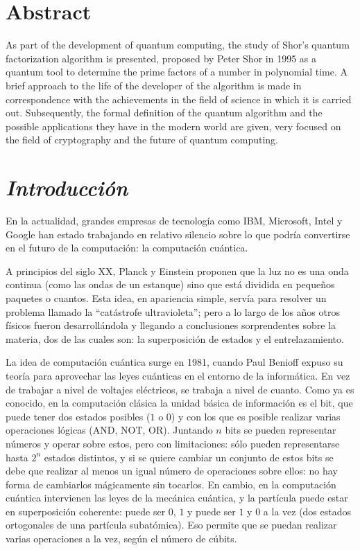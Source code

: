 \documentclass[a4paper,11pt]{article}
\begin{document}
\section*{Abstract}
As part of the development of quantum computing, the study of Shor's quantum factorization algorithm is presented, proposed by Peter Shor in 1995 as a quantum tool to determine the prime factors of a number in polynomial time. A brief approach to the life of the developer of the algorithm is made in correspondence with the achievements in the field of science in which it is carried out. Subsequently, the formal definition of the quantum algorithm and the possible applications they have in the modern world are given, very focused on the field of cryptography and the future of quantum computing.

\section*{\center\itshape\large{Introducci\'on}}
\par En la actualidad, grandes empresas de tecnología como IBM, Microsoft, Intel y Google han estado trabajando en relativo silencio sobre lo que podría convertirse en el futuro de la computación: la computación cuántica.

\par A principios del siglo XX, Planck y Einstein proponen que la luz no es una onda continua (como las ondas de un estanque) sino que está dividida en pequeños paquetes o cuantos. Esta idea, en apariencia simple, servía para resolver un problema llamado la ``catástrofe ultravioleta''; pero a lo largo de los años otros físicos fueron desarrollándola y llegando a conclusiones sorprendentes sobre la materia, dos de las cuales son: la superposición de estados y el entrelazamiento.

\par La idea de computación cuántica surge en 1981, cuando Paul Benioff expuso su teoría para aprovechar las leyes cuánticas en el entorno de la informática. En vez de trabajar a nivel de voltajes eléctricos, se trabaja a nivel de cuanto. Como ya es conocido, en la computación clásica la unidad básica de información es el bit, que puede tener dos estados posibles ($1$ o $0$) y con los que es posible realizar varias operaciones lógicas (AND, NOT, OR). Juntando $n$ bits se pueden representar números y operar sobre estos, pero con limitaciones: sólo pueden representarse hasta $2^n$ estados distintos, y si se quiere cambiar un conjunto de estos bits se debe que realizar al menos un igual número de operaciones sobre ellos: no hay forma de cambiarlos mágicamente sin tocarlos. En cambio, en la computación cuántica intervienen las leyes de la mecánica cuántica, y la partícula puede estar en superposición coherente: puede ser $0$, $1$ y puede ser $1$ y $0$ a la vez (dos estados ortogonales de una partícula subatómica). Eso permite que se puedan realizar varias operaciones a la vez, según el número de cúbits.
\end{document}
